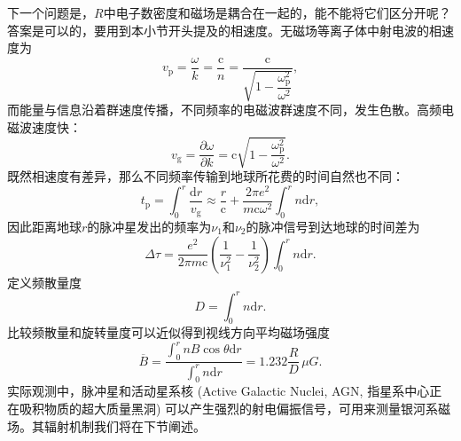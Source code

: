 \documentclass[../天体物理基础.tex]{subfiles}
\begin{document}
\newpage
下一个问题是，$R$中电子数密度和磁场是耦合在一起的，能不能将它们区分开呢？答案是可以的，要用到本小节开头提及的相速度。无磁场等离子体中射电波的相速度为
\begin{equation}
v_{\text{p}}=\frac{\omega}{k}=\frac{\mathrm{c}}{n}=\frac{\mathrm{c}}{\sqrt{1-\dfrac{\omega_{\text{p}}^{2}}{\omega^{2}}}},
\end{equation}
而能量与信息沿着群速度传播，不同频率的电磁波群速度不同，发生色散。高频电磁波速度快：
\begin{equation}
v_{\text{g}}=\frac{\partial{}\omega}{\partial{}k}=\mathrm{c}\sqrt{1-\frac{\omega_{\text{p}}^{2}}{\omega^{2}}}.
\end{equation}
既然相速度有差异，那么不同频率传输到地球所花费的时间自然也不同：
\begin{equation}
t_{\text{p}}=\int_{0}^{r}\frac{\mathrm{d}r}{v_{\text{g}}}\approx\frac{r}{\mathrm{c}}+\frac{2\pi e^{2}}{m\mathrm{c}\omega^{2}}\int_{0}^{r}n\mathrm{d}r,
\end{equation}
因此距离地球$r$的脉冲星发出的频率为$\nu_{1}$和$\nu_{2}$的脉冲信号到达地球的时间差为
\begin{equation}
\Delta{}\tau=\frac{e^{2}}{2\pi m\mathrm{c}}\left(\frac{1}{\nu_{1}^{2}}-\frac{1}{\nu_{2}^{2}}\right)\int_{0}^{r}n\mathrm{d}r.
\end{equation}
定义频散量度
\begin{equation}
D=\int_{0}^{r}n\mathrm{d}r.
\end{equation}
比较频散量和旋转量度可以近似得到视线方向平均磁场强度
\begin{equation}
\overline{B}=\frac{\int_{0}^{r}nB\cos\theta\mathrm{d}r}{\int_{0}^{r}n\mathrm{d}r}=1.232\frac{R}{D}\,\unit{\mu G}.
\end{equation}
实际观测中，脉冲星和活动星系核 (Active Galactic Nuclei, AGN, 指星系中心正在吸积物质的超大质量黑洞) 可以产生强烈的射电偏振信号，可用来测量银河系磁场。其辐射机制我们将在下节阐述。
\end{document}
